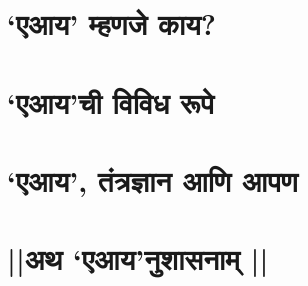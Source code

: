 \chapter*{`एआय' म्हणजे काय? }




\chapter*{`एआय'ची विविध रूपे }



% 
% 

% 
% 
% 
% 

% 
% 
% 
% 

\chapter*{`एआय', तंत्रज्ञान आणि आपण  }


\chapter*{||अथ `एआय'नुशासनाम् ||}
